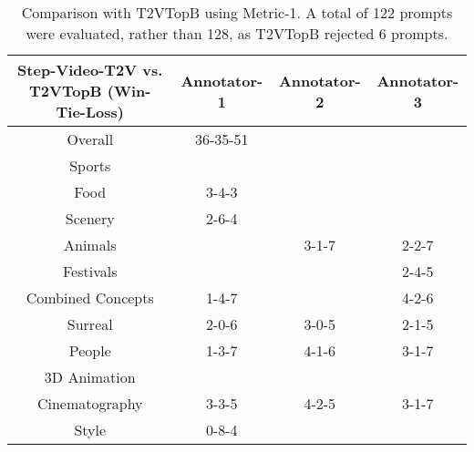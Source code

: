 \begin{table}[ht]\scriptsize
\centering
\begin{tabular}{c|c|c|c}
\hline
Step-Video-T2V vs. T2VTopB (Win-Tie-Loss) & Annotator-1  & Annotator-2 & Annotator-3 \\
\hline
\hline
Overall & 36-35-51 & \cellcolor{green!20}{67-10-45} & \cellcolor{green!20}{55-22-45} \\
\hline
\hline
Sports & \cellcolor{green!20}{8-2-2} & \cellcolor{green!20}{10-1-1} & \cellcolor{green!20}{8-2-2} \\
\hline
Food & 3-4-3 & \cellcolor{green!20}{7-1-2} & \cellcolor{green!20}{7-2-1} \\
\hline
Scenery & 2-6-4 & \cellcolor{yellow!20}{5-2-5} & \cellcolor{green!20}{5-4-3} \\
\hline
Animals & \cellcolor{yellow!20}{5-1-5} & 3-1-7 & 2-2-7 \\
\hline
Festivals & \cellcolor{green!20}{6-1-4} & \cellcolor{green!20}{6-0-5} & 2-4-5 \\
\hline
Combined Concepts & 1-4-7 & \cellcolor{green!20}{6-1-5} & 4-2-6 \\
\hline
Surreal & 2-0-6 & 3-0-5 & 2-1-5 \\
\hline
People & 1-3-7 & 4-1-6 & 3-1-7 \\
\hline
3D Animation & \cellcolor{green!20}{5-3-4} & \cellcolor{green!20}{11-0-1} & \cellcolor{green!20}{11-0-1} \\
\hline
Cinematography & 3-3-5 & 4-2-5 & 3-1-7 \\
\hline
Style & 0-8-4 & \cellcolor{green!20}{8-1-3} & \cellcolor{green!20}{8-3-1} \\
\hline
\end{tabular}
\caption{Comparison with T2VTopB using Metric-1. A total of 122 prompts were evaluated, rather than 128, as T2VTopB rejected 6 prompts.}
\label{ranking-kling}
\end{table}





